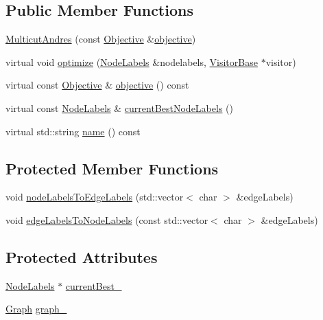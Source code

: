 \subsection*{Public Member Functions}
\begin{DoxyCompactItemize}
\item 
\hyperlink{classnifty_1_1graph_1_1MulticutAndres_a73522acdc6759774aa77f6659ed8eb73}{Multicut\+Andres} (const \hyperlink{classnifty_1_1graph_1_1MulticutAndres_af65f82c6d6f78356d08de6728618fc02}{Objective} \&\hyperlink{classnifty_1_1graph_1_1MulticutAndres_acf13b04a87ba58369e9ceef62d833ced}{objective})
\item 
virtual void \hyperlink{classnifty_1_1graph_1_1MulticutAndres_acc430246a8ed30d4b19c96effe7d6a4d}{optimize} (\hyperlink{classnifty_1_1graph_1_1MulticutAndres_a0948881682fa859a4f2b985e0a95b2c7}{Node\+Labels} \&nodelabels, \hyperlink{classnifty_1_1graph_1_1MulticutAndres_ac07b28fb84cb2202147dd666d5d19c25}{Visitor\+Base} $\ast$visitor)
\item 
virtual const \hyperlink{classnifty_1_1graph_1_1MulticutAndres_af65f82c6d6f78356d08de6728618fc02}{Objective} \& \hyperlink{classnifty_1_1graph_1_1MulticutAndres_acf13b04a87ba58369e9ceef62d833ced}{objective} () const 
\item 
virtual const \hyperlink{classnifty_1_1graph_1_1MulticutAndres_a0948881682fa859a4f2b985e0a95b2c7}{Node\+Labels} \& \hyperlink{classnifty_1_1graph_1_1MulticutAndres_a6d7c55e3b4f2d25438c024739110b923}{current\+Best\+Node\+Labels} ()
\item 
virtual std\+::string \hyperlink{classnifty_1_1graph_1_1MulticutAndres_af7115b9d29d06164b0239e0a0125d3c9}{name} () const 
\end{DoxyCompactItemize}
\subsection*{Protected Member Functions}
\begin{DoxyCompactItemize}
\item 
void \hyperlink{classnifty_1_1graph_1_1MulticutAndres_a036d23a31b5e07e1f038bfdd41ae2640}{node\+Labels\+To\+Edge\+Labels} (std\+::vector$<$ char $>$ \&edge\+Labels)
\item 
void \hyperlink{classnifty_1_1graph_1_1MulticutAndres_a78af8d26a59da4c3f6cb1dfbd9286818}{edge\+Labels\+To\+Node\+Labels} (const std\+::vector$<$ char $>$ \&edge\+Labels)
\end{DoxyCompactItemize}
\subsection*{Protected Attributes}
\begin{DoxyCompactItemize}
\item 
\hyperlink{classnifty_1_1graph_1_1MulticutAndres_a0948881682fa859a4f2b985e0a95b2c7}{Node\+Labels} $\ast$ \hyperlink{classnifty_1_1graph_1_1MulticutAndres_a57f4d9bf3df798e150003ef6183711a8}{current\+Best\+\_\+}
\item 
\hyperlink{classnifty_1_1graph_1_1MulticutAndres_ac0ad695f55ab8ac75ab5f8be6f513652}{Graph} \hyperlink{classnifty_1_1graph_1_1MulticutAndres_a883767b0afbd1a256949ef3238093399}{graph\+\_\+}
\end{DoxyCompactItemize}


